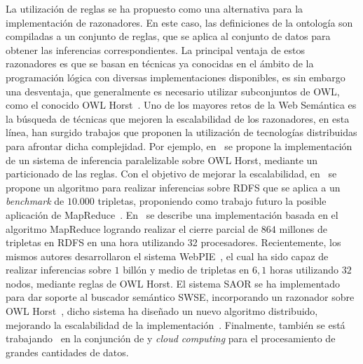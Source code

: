 La utilización de reglas se ha propuesto como una alternativa para la
implementación de razonadores. En este caso, las definiciones de la ontología
son compiladas a un conjunto de reglas, que se aplica al conjunto de datos para obtener las inferencias correspondientes. La principal
ventaja de estos razonadores es que se basan en técnicas ya conocidas en el
ámbito de la programación lógica con diversas implementaciones disponibles, es sin embargo una
desventaja, que generalmente es necesario utilizar subconjuntos de \gls{OWL}, como el
conocido OWL Horst~\cite{Horst2005}. Uno de los mayores retos de la Web Semántica es la búsqueda de técnicas que
mejoren la escalabilidad de los razonadores, en esta línea, han surgido
trabajos que proponen la utilización de tecnologías distribuidas para afrontar
dicha complejidad. Por ejemplo, en~\cite{SomaPrasanna2008}
se propone la implementación de un sistema de inferencia paralelizable sobre OWL
Horst, mediante un particionado de las reglas. Con el objetivo de mejorar la
escalabilidad, en~\cite{springerlink:10.1007/978-3-642-04930-9_43} se propone un algoritmo para realizar inferencias sobre
RDFS que se aplica a un \textit{benchmark} de $10.000$ tripletas, proponiendo como trabajo futuro la posible aplicación de MapReduce~\cite{citeulike:430834,DBLP:conf/semweb/UrbaniKOH09}. En~\cite{UrbaniMaassenBal2010} se describe una implementación basada en el algoritmo MapReduce
logrando realizar el cierre parcial de $864$ millones de tripletas en RDFS en una
hora utilizando 32 procesadores. Recientemente, los mismos autores
desarrollaron el sistema WebPIE~\cite{Urbani2010WebPIE}, el cual ha sido capaz de
realizar inferencias sobre $1$ billón y medio de tripletas en $6,1$ horas utilizando
$32$ nodos, mediante reglas de OWL Horst. El sistema SAOR se ha implementado para
dar soporte al buscador semántico SWSE, incorporando un razonador sobre OWL
Horst~\cite{HoganHarthPolleres2009}, dicho sistema ha diseñado un nuevo algoritmo
distribuido, mejorando la escalabilidad de la implementación~\cite{DBLP:conf/semweb/HoganPPD10}. Finalmente, también se está 
trabajando~\cite{HausenblasCloudLOD} en la conjunción de \linkeddata y \textit{cloud computing} para el procesamiento de grandes cantidades de datos.

